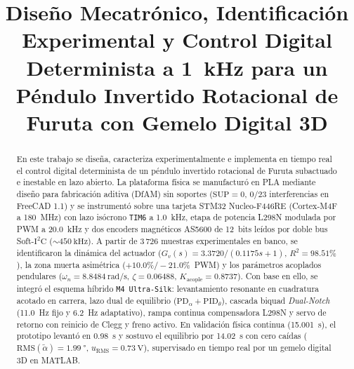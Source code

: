 \documentclass[conference]{IEEEtran}
\begin{document}
\title{Diseño Mecatrónico, Identificación Experimental y Control Digital Determinista a \qty{1}{\kilo\hertz} para un Péndulo Invertido Rotacional de Furuta con Gemelo Digital 3D}

\author{
}

\maketitle

\renewcommand\abstractname{Resumen}
\begin{abstract}
En este trabajo se diseña, caracteriza experimentalmente e implementa en tiempo real el control digital determinista de un péndulo invertido rotacional de Furuta subactuado e inestable en lazo abierto. La plataforma física se manufacturó en PLA mediante diseño para fabricación aditiva (DfAM) sin soportes ($\text{SUP}=0$, $0/23$ interferencias en FreeCAD 1.1) y se instrumentó sobre una tarjeta STM32 Nucleo-F446RE (Cortex-M4F a \qty{180}{\mega\hertz}) con lazo isócrono \texttt{TIM6} a \qty{1.0}{\kilo\hertz}, etapa de potencia L298N modulada por PWM a \qty{20.0}{\kilo\hertz} y dos encoders magnéticos AS5600 de 12~bits leídos por doble bus Soft-$\text{I}^2\text{C}$ ($\sim\qty{450}{\kilo\hertz}$). A partir de $3\,726$ muestras experimentales en banco, se identificaron la dinámica del actuador ($G_v(s)=3.3720/(0.1175s+1)$, $R^2=98.51\%$), la zona muerta asimétrica ($+10.0\% / -21.0\%$~PWM) y los parámetros acoplados pendulares ($\omega_n=\qty{8.8484}{\radian\per\second}$, $\zeta=0.06488$, $K_{\text{acople}}=0.8737$). Con base en ello, se integró el esquema híbrido \texttt{M4 Ultra-Silk}: levantamiento resonante en cuadratura acotado en carrera, lazo dual de equilibrio ($\text{PD}_\alpha + \text{PID}_\theta$), cascada biquad \textit{Dual-Notch} (\qty{11.0}{\hertz} fijo y \qty{6.2}{\hertz} adaptativo), rampa continua compensadora L298N y servo de retorno con reinicio de Clegg y freno activo. En validación física continua (\qty{15.001}{\second}), el prototipo levantó en \qty{0.98}{\second} y sostuvo el equilibrio por \qty{14.02}{\second} con cero caídas ($\mathrm{RMS}(\tilde{\alpha})=\qty{1.99}{\degree}$, $u_{\mathrm{RMS}}=\qty{0.73}{\volt}$), supervisado en tiempo real por un gemelo digital 3D en MATLAB.
\end{abstract}
\end{document}
